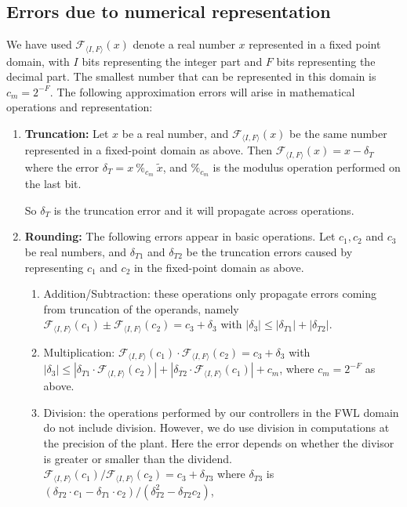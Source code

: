 \documentclass[runningheads,a4paper]{llncs}
\begin{document}
\subsection{Errors due to numerical representation} \label{appendix:numerical_errors}

We have  used $\mathcal{F}_{\langle I,F \rangle}(x)$ denote a real number $x$ represented in a fixed point domain, with $I$ bits representing the integer part and $F$ bits representing the decimal part. The smallest number that can be represented in this domain is $c_m=2^{-F}$.
The following approximation errors will arise in mathematical operations and representation:
\begin{enumerate}
\item {\bf Truncation:}
Let $x$ be a real number, and $\mathcal{F}_{\langle I,F \rangle}(x)$ be the same number represented in a fixed-point domain as above. 
Then $\mathcal{F}_{\langle I,F \rangle}(x) = x-\delta_T$ where the error $ \delta_T=x\ \%_{c_m}\ \tilde x$, and $\%_{c_m}$ is the modulus operation performed on the last bit.

So $\delta_T$ is the truncation error and it will propagate across operations.
%
\item {\bf Rounding:} The following errors appear in basic operations.  Let
$c_1, c_2$ and $c_3$ be real numbers, and $\delta_{T1}$ and $\delta_{T2}$ be
the truncation errors caused by representing $c_1$ and $c_2$ in the
fixed-point domain as above.
%
\begin{enumerate}
%
\item Addition/Subtraction: these operations only propagate errors coming
from truncation of the operands, namely $\mathcal{F}_{\langle I,F
\rangle}(c_1) \pm \mathcal{F}_{\langle I,F \rangle}(c_2) = c_3 + \delta_3$
with $|\delta_3| \leq |\delta_{T1}| + |\delta_{T2}|$.
%
\item Multiplication: $\mathcal{F}_{\langle I,F \rangle}(c_1) \cdot
\mathcal{F}_{\langle I,F \rangle}(c_2) =  c_3 + \delta_3$ with $|\delta_3|
\leq |\delta_{T1}\cdot\mathcal{F}_{\langle I,F \rangle}(c_2)|\allowbreak +
|\delta_{T2}\cdot\mathcal{F}_{\langle I,F \rangle}(c_1)| + c_m$, where
$c_m=2^{-F}$ as above.
%
\item Division: the operations performed by our controllers in the FWL
domain do not include division.  However, we do use division in computations
at the precision of the plant.  Here the error depends on whether the
divisor is greater or smaller than the dividend.  $\mathcal{F}_{\langle I,F
\rangle}(c_1) / \mathcal{F}_{\langle I,F \rangle}(c_2) = c_3 + \delta_{T3}$
where $\delta_{T3}$ is $(\delta_{T2}\cdot c_1 - \delta_{T1}\cdot
c_2)/(\delta_{T2}^2 - \delta_{T2} c_2)$,
%
\end{enumerate}


\end{enumerate}
\end{document}
